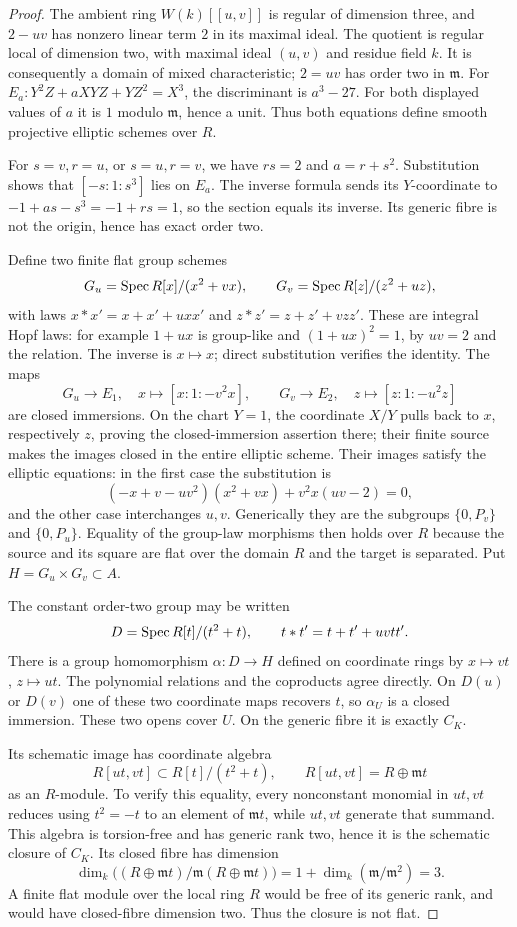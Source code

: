 \begin{proof}
The ambient ring $W(k)[[u,v]]$ is regular of dimension three, and $2-uv$ has nonzero linear term $2$ in its maximal ideal. The quotient is regular local of dimension two, with maximal ideal $(u,v)$ and residue field $k$. It is consequently a domain of mixed characteristic; $2=uv$ has order two in $\mathfrak m$. For $E_a:Y^2Z+aXYZ+YZ^2=X^3$, the discriminant is $a^3-27$. For both displayed values of $a$ it is $1$ modulo $\mathfrak m$, hence a unit. Thus both equations define smooth projective elliptic schemes over $R$.

For $s=v,r=u$, or $s=u,r=v$, we have $rs=2$ and $a=r+s^2$. Substitution shows that $[-s:1:s^3]$ lies on $E_a$. The inverse formula sends its $Y$-coordinate to $-1+as-s^3=-1+rs=1$, so the section equals its inverse. Its generic fibre is not the origin, hence has exact order two.

Define two finite flat group schemes
\[
 G_u=\operatorname{Spec} R[x]/(x^2+vx),\qquad
 G_v=\operatorname{Spec} R[z]/(z^2+uz),
\]
with laws $x*x'=x+x'+uxx'$ and $z*z'=z+z'+vzz'$. These are integral Hopf laws: for example $1+ux$ is group-like and $(1+ux)^2=1$, by $uv=2$ and the relation. The inverse is $x\mapsto x$; direct substitution verifies the identity. The maps
\[
 G_u\longrightarrow E_1,\quad x\longmapsto[x:1:-v^2x],\qquad
 G_v\longrightarrow E_2,\quad z\longmapsto[z:1:-u^2z]
\]
are closed immersions. On the chart $Y=1$, the coordinate $X/Y$ pulls back to $x$, respectively $z$, proving the closed-immersion assertion there; their finite source makes the images closed in the entire elliptic scheme. Their images satisfy the elliptic equations: in the first case the substitution is
\[
 (-x+v-uv^2)(x^2+vx)+v^2x(uv-2)=0,
\]
and the other case interchanges $u,v$. Generically they are the subgroups $\{0,P_v\}$ and $\{0,P_u\}$. Equality of the group-law morphisms then holds over $R$ because the source and its square are flat over the domain $R$ and the target is separated. Put $H=G_u\times G_v\subset A$.

The constant order-two group may be written
\[
 D=\operatorname{Spec} R[t]/(t^2+t),\qquad t*t'=t+t'+uvtt'.
\]
There is a group homomorphism $\alpha:D\to H$ defined on coordinate rings by $x\mapsto vt$, $z\mapsto ut$. The polynomial relations and the coproducts agree directly. On $D(u)$ or $D(v)$ one of these two coordinate maps recovers $t$, so $\alpha_U$ is a closed immersion. These two opens cover $U$. On the generic fibre it is exactly $C_K$.

Its schematic image has coordinate algebra
\[
 R[ut,vt]\subset R[t]/(t^2+t),\qquad
 R[ut,vt]=R\oplus\mathfrak m t
\]
as an $R$-module. To verify this equality, every nonconstant monomial in $ut,vt$ reduces using $t^2=-t$ to an element of $\mathfrak m t$, while $ut,vt$ generate that summand. This algebra is torsion-free and has generic rank two, hence it is the schematic closure of $C_K$. Its closed fibre has dimension
\[
 \dim_k\bigl((R\oplus\mathfrak m t)/\mathfrak m(R\oplus\mathfrak m t)\bigr)
 =1+\dim_k(\mathfrak m/\mathfrak m^2)=3.
\]
A finite flat module over the local ring $R$ would be free of its generic rank, and would have closed-fibre dimension two. Thus the closure is not flat.


\end{proof}
